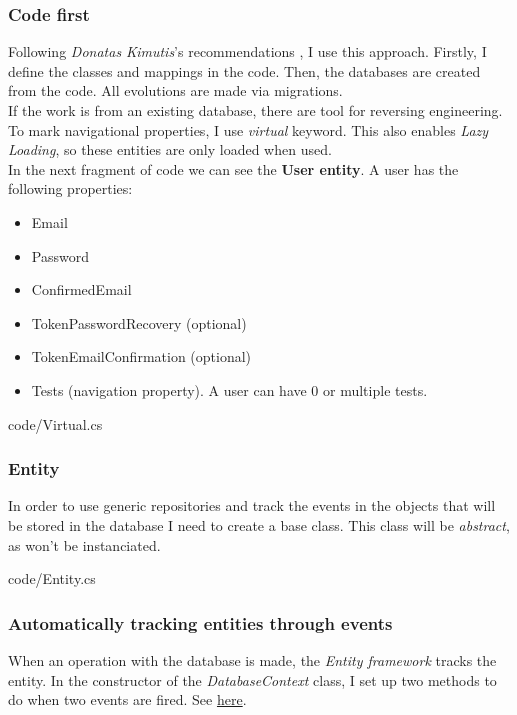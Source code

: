         \subsubsection{Code first}
        Following \textit{Donatas Kimutis}'s recommendations \cite{Kimutis}, I use this approach. Firstly, I define the classes and mappings in the code. Then, the databases are created from the code. All evolutions are made via migrations. \\
        If the work is from an existing database, there are tool for reversing engineering. \\

        To mark navigational properties, I use \textit{virtual} keyword. This also enables \textit{Lazy Loading}, so these entities are only loaded when used. \\

        In the next fragment of code we can see the \textbf{User entity}. A user has the following properties:
        \begin{itemize}[noitemsep]
            \item Email
            \item Password
            \item ConfirmedEmail
            \item TokenPasswordRecovery (optional)
            \item TokenEmailConfirmation (optional)
            \item Tests (navigation property). A user can have 0 or multiple tests.
        \end{itemize}

        
        {code/Virtual.cs}

        \subsubsection{Entity}
            In order to use generic repositories and track the events in the objects that will be stored in the database I need to create a base class. This class will be \textit{abstract}, as won't be instanciated. 
            
            
            {code/Entity.cs}

        \subsubsection{Automatically tracking entities through events}
        When an operation with the database is made, the \textit{Entity framework} tracks the entity.  
        In the constructor of the \textit{DatabaseContext} class, I set up two methods to do when two events are fired. See \href{https://docs.microsoft.com/en-us/dotnet/api/microsoft.entityframeworkcore.changetracking.changetracker?view=efcore-5.0}{here}. \\

